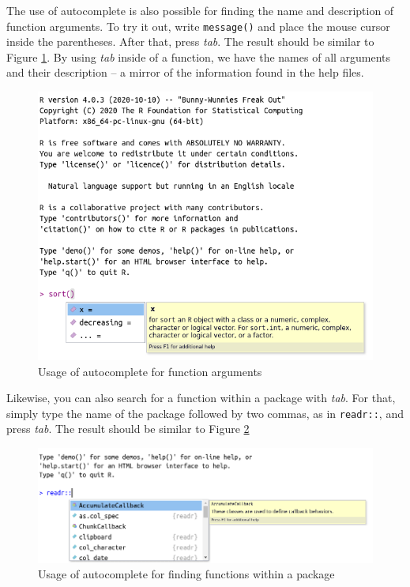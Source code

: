 \documentclass[
  12pt,
]{book}
\begin{document}
The use of autocomplete is also possible for finding the name and description of function arguments. To try it out, write \texttt{message()} and place the mouse cursor inside the parentheses. After that, press \emph{tab}. The result should be similar to Figure \ref{fig:autocomplete-args}. By using \emph{tab} inside of a function, we have the names of all arguments and their description -- a mirror of the information found in the help files.

\begin{figure}[!htbp]

{\centering \includegraphics[width=0.75\linewidth]{figs/autocomplete_args} 

}

\caption{Usage of autocomplete for function arguments}\label{fig:autocomplete-args}
\end{figure}

Likewise, you can also search for a function within a package with \emph{tab}. For that, simply type the name of the package followed by two commas, as in \texttt{readr::}, and press \emph{tab}. The result should be similar to Figure \ref{fig:autocomplete-pkg-fct}

\begin{figure}[!htbp]

{\centering \includegraphics[width=0.75\linewidth]{figs/autocomplete_pkg_fcts} 

}

\caption{Usage of autocomplete for finding functions within a package}\label{fig:autocomplete-pkg-fct}
\end{figure}
\end{document}
